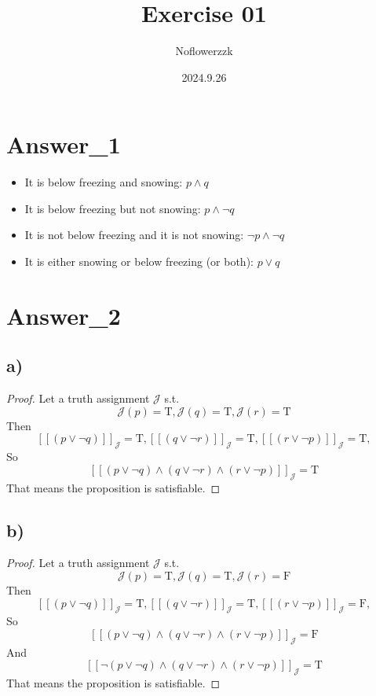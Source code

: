\documentclass{article}
\title{Exercise 01}
\author{Noflowerzzk}
\date{2024.9.26}
\begin{document}
\maketitle

\section{Answer\_1}
\begin{itemize}
    \item It is below freezing and snowing: $p\land q$
    \item It is below freezing but not snowing: $p \land \lnot q$
    \item It is not below freezing and it is not snowing: $\lnot p \land \lnot q$
    \item It is either snowing or below freezing (or both): $p \lor q$
\end{itemize}



\section{Answer\_2}
\subsection{a)}
\begin{proof}
    Let a truth assignment $\mathcal{J} $ s.t. 
    \[
        \mathcal{J}(p)=\text{T}, \mathcal{J}(q)=\text{T}, \mathcal{J}(r)=\text{T}
    \]
    Then
    \[
        [\![(p \lor\lnot q)]\!]_\mathcal{J}=\text{T}, 
        [\![(q \lor\lnot r)]\!]_\mathcal{J}=\text{T},
        [\![(r \lor\lnot p)]\!]_\mathcal{J}=\text{T},
    \]
    So
    \[
        [\![(p \lor \neg q) \land (q \lor \neg r) \land (r \lor \neg p)]\!]_\mathcal{J}=\text{T}
     \]
    That means the proposition is satisfiable.
    \qedhere
\end{proof}

\subsection{b)}
\begin{proof}
    Let a truth assignment $\mathcal{J} $ s.t. 
    \[
        \mathcal{J}(p)=\text{T}, \mathcal{J}(q)=\text{T}, \mathcal{J}(r)=\text{F}
    \]
    Then
    \[
        [\![(p \lor\lnot q)]\!]_\mathcal{J}=\text{T}, 
        [\![(q \lor\lnot r)]\!]_\mathcal{J}=\text{T},
        [\![(r \lor\lnot p)]\!]_\mathcal{J}=\text{F},
    \]
    So
    \[
        [\![(p \lor \neg q) \land (q \lor \neg r) \land (r \lor \neg p)]\!]_\mathcal{J}=\text{F}
    \]
    And
    \[
        [\![\lnot(p \lor \neg q) \land (q \lor \neg r) \land (r \lor \neg p)]\!]_\mathcal{J}=\text{T}
    \]
    That means the proposition is satisfiable.
    \qedhere
\end{proof}
\end{document}
